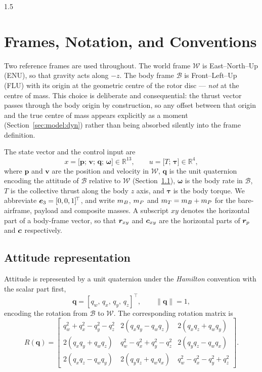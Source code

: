 \begin{spacing}{1.5}
\section{Frames, Notation, and Conventions}\label{sec:model:frames}

Two reference frames are used throughout. The world frame $\mathcal{W}$ is
East--North--Up (ENU), so that gravity acts along $-z$. The body frame
$\mathcal{B}$ is Front--Left--Up (FLU) with its origin at the geometric centre of
the rotor disc --- \emph{not} at the centre of mass. This choice is deliberate
and consequential: the thrust vector passes through the body origin by
construction, so any offset between that origin and the true centre of mass
appears explicitly as a moment (Section~\ref{sec:model:dyn}) rather than being
absorbed silently into the frame definition.

The state vector and the control input are
\begin{equation}
x = \bigl[\bm{p};\, \bm{v};\, \bm{q};\, \bm{\omega}\bigr] \in \mathbb{R}^{13},
\qquad
u = \bigl[T;\, \bm{\tau}\bigr] \in \mathbb{R}^{4},
\label{eq:state}
\end{equation}
where $\bm{p}$ and $\bm{v}$ are the position and velocity in $\mathcal{W}$,
$\bm{q}$ is the unit quaternion encoding the attitude of $\mathcal{B}$ relative
to $\mathcal{W}$ (Section~\ref{sec:model:quat}),
$\bm{\omega}$ is the body rate in $\mathcal{B}$, $T$ is the collective thrust
along the body $z$ axis, and $\bm{\tau}$ is the body torque. We abbreviate
$\bm{e}_3 = [0,0,1]^{\!\top}$, and write $m_B$, $m_P$ and $m_T=m_B+m_P$ for the
bare-airframe, payload and composite masses. A subscript $xy$ denotes the
horizontal part of a body-frame vector, so that $\bm{r}_{xy}$ and $\bm{c}_{xy}$ are the
horizontal parts of $\bm{r}_p$ and $\bm{c}$ respectively.

\subsection{Attitude representation}\label{sec:model:quat}

Attitude is represented by a unit quaternion under the \emph{Hamilton} convention
with the scalar part first,
\begin{equation}
\bm{q} = [q_w,\, q_x,\, q_y,\, q_z]^{\!\top},
\qquad \|\bm{q}\| = 1,
\label{eq:quatdef}
\end{equation}
encoding the rotation from $\mathcal{B}$ to $\mathcal{W}$. The corresponding
rotation matrix is
\begin{equation}
R(\bm{q}) =
\begin{bmatrix}
q_w^2 + q_x^2 - q_y^2 - q_z^2 & 2(q_xq_y - q_wq_z) & 2(q_xq_z + q_wq_y) \\[2pt]
2(q_xq_y + q_wq_z) & q_w^2 - q_x^2 + q_y^2 - q_z^2 & 2(q_yq_z - q_wq_x) \\[2pt]
2(q_xq_z - q_wq_y) & 2(q_yq_z + q_wq_x) & q_w^2 - q_x^2 - q_y^2 + q_z^2
\end{bmatrix}.
\label{eq:Rq}
\end{equation}


\end{spacing}
